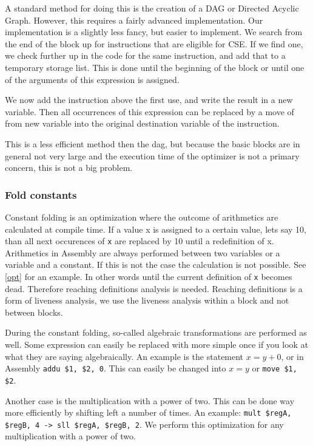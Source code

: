 \documentclass[10pt,a4paper]{article}
\begin{document}
A standard method for doing this is the creation of a DAG or Directed Acyclic
Graph. However, this requires a fairly advanced implementation. Our
implementation is a slightly less fancy, but easier to implement.
We search from the end of the block up for instructions that are eligible for
CSE. If we find one, we check further up in the code for the same instruction,
and add that to a temporary storage list. This is done until the beginning of
the block or until one of the arguments of this expression is assigned.

We now add the instruction above the first use, and write the result in a new
variable. Then all occurrences of this expression can be replaced by a move of
from new variable into the original destination variable of the instruction.

This is a less efficient method then the dag, but because the basic blocks are
in general not very large and the execution time of the optimizer is not a
primary concern, this is not a big problem.

\subsubsection*{Fold constants}
Constant folding is an optimization where the outcome of arithmetics are
calculated at compile time. If a value x is assigned to a certain value, lets
say 10, than all next occurences of \texttt{x} are replaced by 10 until a
redefinition of x. Arithmetics in Assembly are always performed between two
variables or a variable and a constant. If this is not the case the calculation
is not possible. See \ref{opt} for an example. In other words until the current
definition of \texttt{x} becomes dead. Therefore reaching definitions analysis
is needed. Reaching definitions is a form of liveness analysis, we use the
liveness analysis within a block and not between blocks.

During the constant folding, so-called algebraic transformations are performed
as well. Some expression can easily be replaced with more simple once if you
look at what they are saying algebraically. An example is the statement
$x = y + 0$, or in Assembly \texttt{addu \$1, \$2, 0}. This can easily be
changed into $x = y$ or \texttt{move \$1, \$2}.

Another case is the multiplication with a power of two. This can be done way
more efficiently by shifting left a number of times. An example:
\texttt{mult \$regA, \$regB, 4    ->  sll  \$regA, \$regB, 2}. We perform this
optimization for any multiplication with a power of two.
\end{document}
